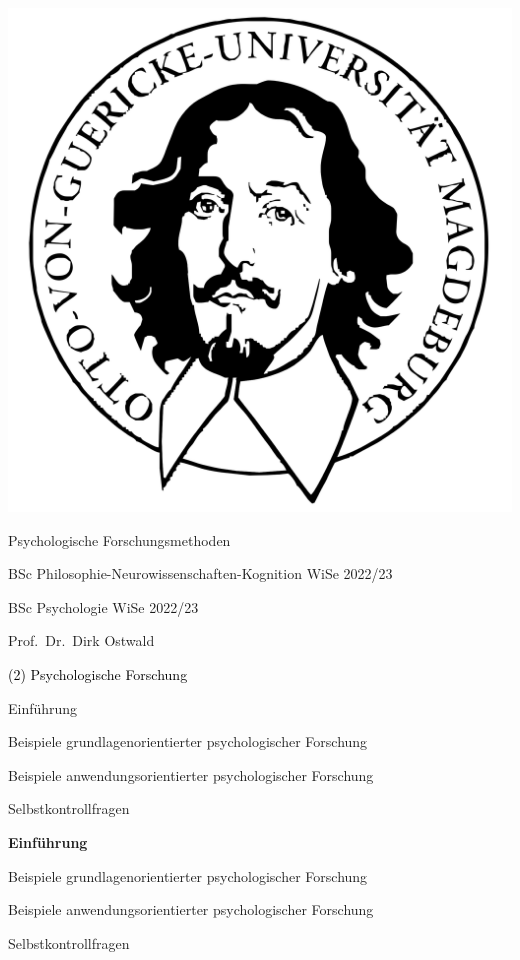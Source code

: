 \documentclass[
  8pt,
  ignorenonframetext,
]{beamer}
\author{}
\date{\vspace{-2.5em}}
\begin{document}
\begin{frame}[plain]{}
\protect\hypertarget{section}{}
\center

\begin{center}\includegraphics[width=0.2\linewidth]{2_Abbildungen/pfm_2_otto} \end{center}

\vspace{2mm}

\Large

Psychologische Forschungsmethoden \vspace{6mm}

\normalsize

BSc Philosophie-Neurowissenschaften-Kognition WiSe 2022/23

BSc Psychologie WiSe 2022/23

\large
\vspace{6mm}

Prof.~Dr.~Dirk Ostwald
\end{frame}

\begin{frame}[plain]{}
\protect\hypertarget{section-1}{}
\vfill
\center
\huge

\textcolor{black}{(2) Psychologische Forschung} \vfill
\end{frame}

\begin{frame}{}
\protect\hypertarget{section-2}{}
\large

Einführung

Beispiele grundlagenorientierter psychologischer Forschung

Beispiele anwendungsorientierter psychologischer Forschung

Selbstkontrollfragen
\end{frame}

\begin{frame}{}
\protect\hypertarget{section-3}{}
\large

\textbf{Einführung}

Beispiele grundlagenorientierter psychologischer Forschung

Beispiele anwendungsorientierter psychologischer Forschung

Selbstkontrollfragen
\end{frame}
\end{document}
